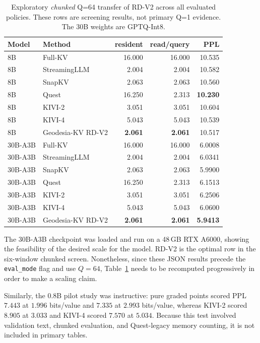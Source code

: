 \documentclass[10pt,twocolumn]{article}
\newcommand{\method}{Geodesia-KV}
\newcommand{\bpv}{bits/value}
\begin{document}
\begin{table}[t]
\centering\small
\caption{Exploratory \emph{chunked} Q=64 transfer of RD-V2 across all evaluated policies. These rows are screening results, not primary Q=1 evidence. The 30B weights are GPTQ-Int8.}
\label{tab:explore}
\begin{tabular}{llrrr}
\toprule
Model & Method & resident & read/query & PPL \\
\midrule
8B & Full-KV & 16.000 & 16.000 & 10.535 \\
8B & StreamingLLM & 2.004 & 2.004 & 10.582 \\
8B & SnapKV & 2.063 & 2.063 & 10.560 \\
8B & Quest & 16.250 & 2.313 & \textbf{10.230} \\
8B & KIVI-2 & 3.051 & 3.051 & 10.604 \\
8B & KIVI-4 & 5.043 & 5.043 & 10.539 \\
8B & \method{} RD-V2 & \textbf{2.061} & \textbf{2.061} & 10.517 \\
\midrule
30B-A3B & Full-KV & 16.000 & 16.000 & 6.0008 \\
30B-A3B & StreamingLLM & 2.004 & 2.004 & 6.0341 \\
30B-A3B & SnapKV & 2.063 & 2.063 & 5.9900 \\
30B-A3B & Quest & 16.250 & 2.313 & 6.1513 \\
30B-A3B & KIVI-2 & 3.051 & 3.051 & 6.2506 \\
30B-A3B & KIVI-4 & 5.043 & 5.043 & 6.0600 \\
30B-A3B & \method{} RD-V2 & \textbf{2.061} & \textbf{2.061} & \textbf{5.9413} \\
\bottomrule
\end{tabular}
\end{table}
The 30B-A3B checkpoint was loaded and run on a 48\,GB RTX A6000, showing the
feasibility of the desired scale for the model. RD-V2 is the optimal row in
the six-window chunked screen. Nonetheless, since these JSON results precede
the \texttt{eval\_mode} flag and use $Q=64$, Table~\ref{tab:explore} needs
to be recomputed progressively in order to make a scaling claim.

Similarly, the 0.8B pilot study was instructive: pure graded points scored
PPL $7.443$ at $1.996$ \bpv{} and $7.335$ at $2.993$ \bpv{}, whereas
KIVI-2 scored $8.905$ at $3.033$ and KIVI-4 scored $7.570$ at $5.034$.
Because this test involved validation text, chunked evaluation, and
Quest-legacy memory counting, it is not included in primary tables.
\end{document}
